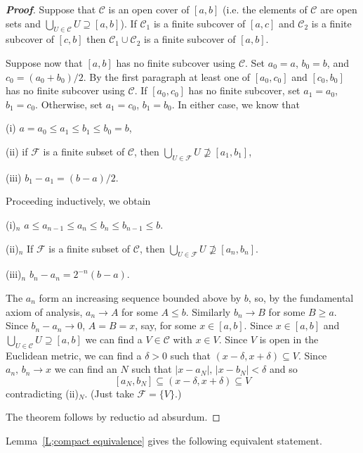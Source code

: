 \begin{proof}[\bf Proof] Suppose that ${\mathcal C}$
is an open cover of $[a,b]$ (i.e. the elements of ${\mathcal C}$
are open sets and $\bigcup_{U\in{\mathcal C}}U\supseteq[a,b]$).
If  ${\mathcal C}_{1}$
is a finite subcover of $[a,c]$
and ${\mathcal C}_{2}$
is a finite subcover of $[c,b]$
then ${\mathcal C}_{1}\cup{\mathcal C}_{2}$
is a finite subcover of $[a,b]$.

Suppose now that $[a,b]$ has no finite subcover using ${\mathcal C}$.
Set $a_{0}=a$, $b_{0}=b$, and $c_{0}=(a_{0}+b_{0})/2$.
By the first paragraph at least one of $[a_{0},c_{0}]$
and $[c_{0},b_{0}]$ has no finite subcover using ${\mathcal C}$.
If $[a_{0},c_{0}]$ has no finite subcover, set $a_{1}=a_{0}$,
$b_{1}=c_{0}$. Otherwise, set $a_{1}=c_{0}$,
$b_{1}=b_{0}$. In either case, we know that

(i) $a=a_{0}\leq a_{1}\leq b_{1}\leq b_{0}=b$,

(ii) if ${\mathcal F}$ is a finite subset of ${\mathcal C}$,
then $\bigcup_{U\in{\mathcal F}}U\not\supseteq [a_{1},b_{1}]$,

(iii) $b_{1}-a_{1}=(b-a)/2$.

Proceeding inductively, we obtain

(i)$_{n}$ $a\leq a_{n-1}\leq a_{n}\leq b_{n}\leq b_{n-1}\leq b$.

(ii)$_{n}$ If ${\mathcal F}$ is a finite subset of ${\mathcal C}$,
then $\bigcup_{U\in{\mathcal F}}U\not\supseteq [a_{n},b_{n}]$.

(iii)$_{n}$ $b_{n}-a_{n}=2^{-n}(b-a)$.

The $a_{n}$ form an increasing sequence bounded above by $b$, so,
by the fundamental axiom of analysis, $a_{n}\rightarrow A$
for some $A \leq b$. Similarly $b_{n}\rightarrow B$ for some
$B\geq a$. Since $b_{n}-a_{n}\rightarrow 0$, $A=B=x$, say,
for some $x\in [a,b]$. Since $x\in [a,b]$ and
$\bigcup_{U\in{\mathcal C}}U\supseteq[a,b]$
we can find a $V\in {\mathcal C}$
with $x\in V$. Since $V$ is open in the Euclidean metric,
we can find a $\delta>0$
such that $(x-\delta,x+\delta)\subseteq V$. Since $a_{n},\,b_{n}\rightarrow x$
we can find an $N$ such that $|x-a_{N}|,\,|x-b_{N}|<\delta$ and so
\[[a_{N},b_{N}]\subseteq (x-\delta,x+\delta)\subseteq V\]
contradicting (ii)$_{N}$. (Just take ${\mathcal F}=\{V\}$.)

The theorem follows by reductio ad absurdum.
\end{proof}


Lemma~\ref{L;compact equivalence} gives the following equivalent statement.

